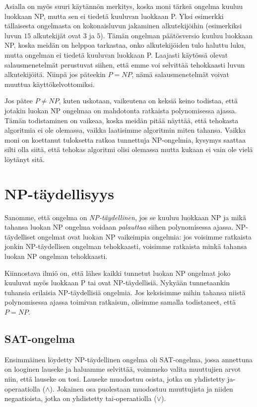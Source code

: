 Asialla on myös suuri käytännön merkitys,
koska moni tärkeä ongelma kuuluu luokkaan NP,
mutta sen ei tiedetä kuuluvan luokkaan P.
Yksi esimerkki tällaisesta ongelmasta on kokonaisluvun
jakaminen alkutekijöihin (esimerkiksi luvun $15$
alkutekijät ovat $3$ ja $5$).
Tämän ongelman päätösversio kuuluu luokkaan NP,
koska meidän on helppoa tarkastaa,
onko alkutekijöiden tulo haluttu luku,
mutta ongelman ei tiedetä kuuluvan luokkaan P.
Laajasti käytössä olevat salausmenetelmät perustuvat siihen,
että emme voi selvittää tehokkaasti luvun alkutekijöitä.
Niinpä jos päteekin $P=NP$, nämä salausmenetelmät voivat
muuttua käyttökelvottomiksi.

Jos pätee $P \neq NP$, kuten uskotaan,
vaikeutena on keksiä keino todistaa, että jotakin
luokan NP ongelmaa on mahdotonta ratkaista
polynomisessa ajassa.
Tämän todistaminen on vaikeaa, koska meidän pitää näyttää,
että tehokasta algoritmia ei ole olemassa,
vaikka laatisimme algoritmin miten tahansa.
Vaikka moni on koettanut tuloksetta ratkoa
tunnettuja NP-ongelmia, kysymys saattaa silti olla siitä,
että tehokas algoritmi olisi olemassa mutta kukaan ei
vain ole vielä löytänyt sitä.

\section{NP-täydellisyys}

Sanomme, että ongelma on \emph{NP-täydellinen},
jos se kuuluu luokkaan NP ja mikä tahansa luokan NP
ongelma voidaan \emph{palauttaa} siihen polynomisessa ajassa.
NP-täydelliset ongelmat ovat luokan NP vaikeimpia ongelmia:
jos voisimme ratkaista jonkin NP-täydellisen ongelman tehokkaasti,
voisimme ratkaista minkä tahansa luokan NP ongelman tehokkaasti.

Kiinnostava ilmiö on, että lähes kaikki tunnetut luokan NP
ongelmat joko kuuluvat myös luokkaan P tai ovat
NP-täydellisiä.
Nykyään tunnetaankin tuhansia erilaisia NP-täydellisiä ongelmia.
Jos keksisimme mihin tahansa niistä polynomisessa ajassa toimivan
ratkaisun, olisimme samalla todistaneet, että $P=NP$.

\subsection{SAT-ongelma}

Ensimmäinen löydetty NP-täydellinen ongelma oli
SAT-ongelma, jossa annettuna on looginen lauseke ja haluamme
selvittää, voimmeko valita muuttujien arvot niin,
että lauseke on tosi.
Lauseke muodostuu osista, jotka on yhdistetty
ja-operaatiolla ($\land$). Jokainen osa puolestaan muodostuu
muuttujista ja niiden negaatioista, jotka on yhdistetty
tai-operaatiolla ($\lor$).

